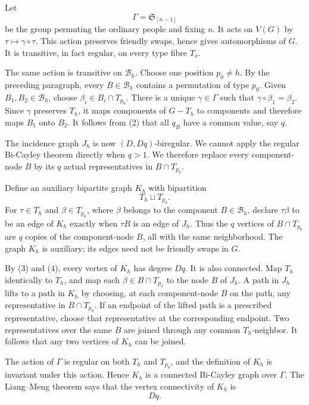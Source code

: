 \documentclass[11pt]{article}
\begin{document}
Let
\[
\Gamma=\mathfrak S_{[n-1]}
\]
be the group permuting the ordinary people and fixing \(n\). It acts on \(V(G)\) by \(\tau\mapsto\gamma\circ\tau\). This action preserves friendly swaps, hence gives automorphisms of \(G\). It is transitive, in fact regular, on every type fibre \(T_x\).

The same action is transitive on \(\mathcal B_h\). Choose one position \(p_0\neq h\). By the preceding paragraph, every \(B\in\mathcal B_h\) contains a permutation of type \(p_0\). Given \(B_1,B_2\in\mathcal B_h\), choose \(\beta_i\in B_i\cap T_{p_0}\). There is a unique \(\gamma\in\Gamma\) such that \(\gamma\circ\beta_1=\beta_2\). Since \(\gamma\) preserves \(T_h\), it maps components of \(G-T_h\) to components and therefore maps \(B_1\) onto \(B_2\). It follows from (2) that all \(q_B\) have a common value, say \(q\).

The incidence graph \(J_h\) is now \((D,Dq)\)-biregular. We cannot apply the regular Bi-Cayley theorem directly when \(q>1\). We therefore replace every component-node \(B\) by its \(q\) actual representatives in \(B\cap T_{p_0}\).

Define an auxiliary bipartite graph \(K_h\) with bipartition
\[
T_h\sqcup T_{p_0}.
\]
For \(\tau\in T_h\) and \(\beta\in T_{p_0}\), where \(\beta\) belongs to the component \(B\in\mathcal B_h\), declare \(\tau\beta\) to be an edge of \(K_h\) exactly when \(\tau B\) is an edge of \(J_h\). Thus the \(q\) vertices of \(B\cap T_{p_0}\) are \(q\) copies of the component-node \(B\), all with the same neighborhood. The graph \(K_h\) is auxiliary; its edges need not be friendly swaps in \(G\).

By (3) and (4), every vertex of \(K_h\) has degree \(Dq\). It is also connected. Map \(T_h\) identically to \(T_h\), and map each \(\beta\in B\cap T_{p_0}\) to the node \(B\) of \(J_h\). A path in \(J_h\) lifts to a path in \(K_h\) by choosing, at each component-node \(B\) on the path, any representative in \(B\cap T_{p_0}\). If an endpoint of the lifted path is a prescribed representative, choose that representative at the corresponding endpoint. Two representatives over the same \(B\) are joined through any common \(T_h\)-neighbor. It follows that any two vertices of \(K_h\) can be joined.

The action of \(\Gamma\) is regular on both \(T_h\) and \(T_{p_0}\), and the definition of \(K_h\) is invariant under this action. Hence \(K_h\) is a connected Bi-Cayley graph over \(\Gamma\). The Liang--Meng theorem says that the vertex connectivity of \(K_h\) is
\[
Dq.\tag{5}
\]
\end{document}

